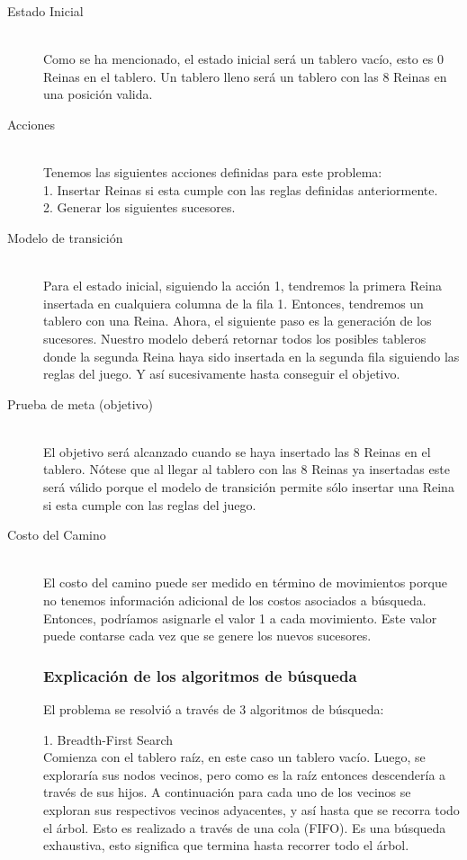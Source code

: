 \documentclass[letter, 10pt]{article}
\begin{document}
\begin{description}
    \item[Estado Inicial] \hfill \\
    Como se ha mencionado, el estado inicial será un tablero vacío, esto es 0 Reinas en el tablero. Un tablero lleno será un tablero con las 8 Reinas en una posición valida.
    \item[Acciones] \hfill \\
    Tenemos las siguientes acciones definidas para este problema: \\
    1. Insertar Reinas si esta cumple con las reglas definidas anteriormente.\\
    2. Generar los siguientes sucesores.
    \item[Modelo de transición] \hfill \\
    Para el estado inicial, siguiendo la acción 1, tendremos la primera Reina insertada en cualquiera columna de la fila 1. Entonces, tendremos un tablero con una Reina. Ahora, el siguiente paso es la generación de los sucesores. Nuestro modelo deberá retornar todos los posibles tableros donde la segunda Reina haya sido insertada en la segunda fila siguiendo las reglas del juego. Y así sucesivamente hasta conseguir el objetivo.
    \item[Prueba de meta (objetivo)] \hfill \\
    El objetivo será alcanzado cuando se haya insertado las 8 Reinas en el tablero. Nótese que al llegar al tablero con las 8 Reinas ya insertadas este será válido porque el modelo de transición permite sólo insertar una Reina si esta cumple con las reglas del juego.
    \item[Costo del Camino] \hfill \\
    El costo del camino puede ser medido en término de movimientos porque no tenemos información adicional de los costos asociados a búsqueda. Entonces, podríamos asignarle el valor 1 a cada movimiento. Este valor puede contarse cada vez que se genere los nuevos sucesores. \\

\subsubsection{Explicación de los algoritmos de búsqueda}

El problema se resolvió a través de 3 algoritmos de búsqueda:

1. Breadth-First Search \\
Comienza con el tablero raíz, en este caso un tablero vacío. Luego, se exploraría sus nodos vecinos, pero como es la raíz entonces descendería a través de sus hijos. A continuación para cada uno de los vecinos se exploran sus respectivos vecinos adyacentes, y así hasta que se recorra todo el árbol. Esto es realizado a través de una cola (FIFO). Es una búsqueda exhaustiva, esto significa que termina hasta recorrer todo el árbol. \\


\end{description}
\end{document}
